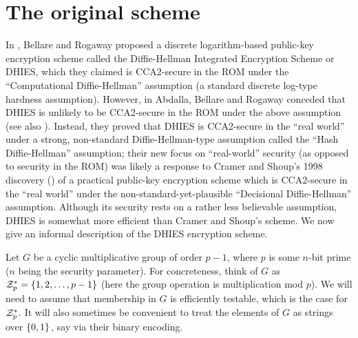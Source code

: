 \section{The original scheme}
\label{SEC:DHIES}
In \cite{bellare:minroms}, Bellare and Rogaway proposed a discrete
logarithm-based public-key encryption scheme called 
the Diffie-Hellman Integrated Encryption Scheme or DHIES, which they claimed
is CCA2-secure in the ROM under the ``Computational Diffie-Hellman''
assumption (a standard discrete log-type hardness assumption). However, in
\cite{abdalla:dhies1} Abdalla, Bellare and Rogaway conceded that DHIES is
unlikely to be CCA2-secure in the ROM under the above assumption (see also
\cite{abdalla:dhies2}). Instead, they proved that DHIES is CCA2-secure in
the ``real world'' under a strong, non-standard Diffie-Hellman-type
assumption called the ``Hash Diffie-Hellman'' assumption;  their new focus on
``real-world'' security (as opposed to security in the ROM) was likely a
response to Cramer and Shoup's 1998 discovery (\cite{cramer:cca2secure}) of a
practical public-key encryption scheme which is CCA2-secure in the ``real
world'' under the non-standard-yet-plausible ``Decisional Diffie-Hellman''
assumption. Although its security rests on a rather less believable
assumption, DHIES is somewhat more efficient than Cramer and Shoup's scheme.
We now give an informal description of the DHIES encryption scheme.


Let $G$ be a cyclic multiplicative group of order $p-1$, where $p$ is some
$n$-bit prime ($n$ being the security parameter). For concreteness, 
think of $G$ as $\mathcal{Z}^{*}_p = \{1,2,\ldots,p - 1\}$ (here the group
operation is multiplication mod $p$). We will need to assume that membership in
$G$ is efficiently testable, which is the case for $\mathcal{Z}^*_p$. It will also
sometimes be convenient to treat the elements of $G$ as strings over
$\{0,1\}^{}$, say via their binary encoding.  

